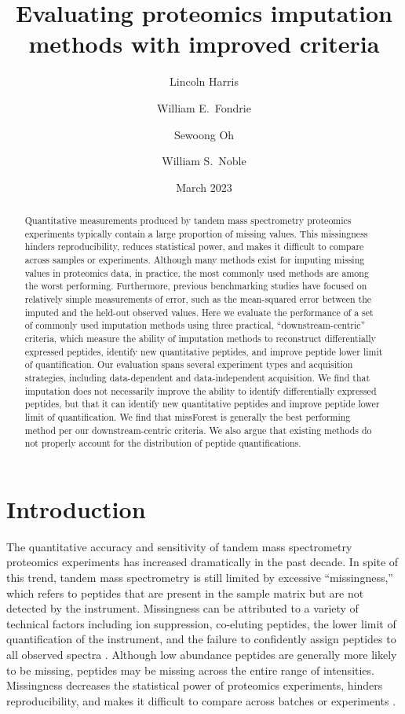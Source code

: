 \documentclass{article}
\title{Evaluating proteomics imputation methods with improved criteria}
\author[1]{Lincoln Harris}
\author[2]{William E.\ Fondrie}
\author[3]{Sewoong Oh}
\author[1,3]{William S.\ Noble}
\affil[1]{Department of Genome Sciences, University of Washington}
\affil[2]{Talus Biosciences}
\affil[3]{Paul G.\ Allen School of Computer Science and Engineering,
  University of Washington}
\date{March 2023}
\begin{document}
\maketitle

\begin{abstract}
  Quantitative measurements produced by tandem mass spectrometry proteomics experiments typically contain a large proportion of missing values. This missingness hinders reproducibility, reduces statistical power, and makes it difficult to compare across samples or experiments. Although many methods exist for imputing missing values in proteomics data, in practice, the most commonly used methods are among the worst performing. Furthermore, previous benchmarking studies have focused on relatively simple measurements of error, such as the mean-squared error between the imputed and the held-out observed values.  Here we evaluate the performance of a set of commonly used imputation methods using three  practical, ``downstream-centric'' criteria, which measure the ability of imputation methods to reconstruct differentially expressed peptides, identify new quantitative peptides, and improve peptide lower limit of quantification. Our evaluation spans several experiment types and acquisition strategies, including data-dependent and data-independent acquisition. We find that imputation does not necessarily improve the ability to identify differentially expressed peptides, but that it can identify new quantitative peptides and improve peptide lower limit of quantification. We find that missForest is generally the best performing method per our downstream-centric criteria. We also argue that existing methods do not properly account for the distribution of peptide quantifications. 
\end{abstract}

\section{Introduction}

The quantitative accuracy and sensitivity of tandem mass spectrometry proteomics experiments has increased dramatically in the past decade. In spite of this trend, tandem mass spectrometry is still limited by excessive ``missingness,'' which refers to peptides that are present in the sample matrix but are not detected by the instrument. Missingness can be attributed to a variety of technical factors including ion suppression, co-eluting peptides, the lower limit of quantification of the instrument, and the failure to confidently assign peptides to all observed spectra \cite{Bramer:review, Webb-Robertson:review}. Although low abundance peptides are generally more likely to be missing, peptides may be missing across the entire range of intensities. Missingness decreases the statistical power of proteomics experiments, hinders reproducibility, and makes it difficult to compare across batches or experiments \cite{Bramer:review, Webb-Robertson:review}. 
\end{document}
